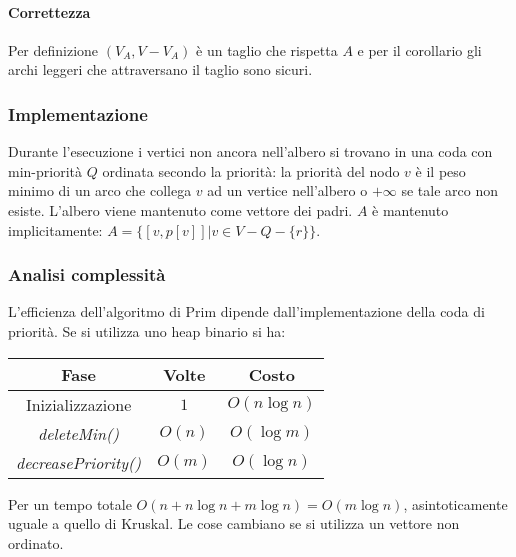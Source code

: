 	\paragraph{Correttezza} Per definizione $(V_A, V - V_A)$ \`e un taglio che rispetta $A$ e per il corollario gli archi leggeri che attraversano il taglio sono sicuri. 
	\subsubsection{Implementazione}
	Durante l'esecuzione i vertici non ancora nell'albero si trovano in una coda con min-priorit\`a $Q$ ordinata secondo la priorit\`a: la priorit\`a del nodo $v$ \`e il peso minimo di un
	arco che collega $v$ ad un vertice nell'albero o $+\infty$ se tale arco non esiste. L'albero viene mantenuto come vettore dei padri. $A$ \`e mantenuto implicitamente: $A=\{[v, p[v]]|v\in
	V-Q-\{r\}\}$. \\
	
	\subsubsection{Analisi complessit\`a}
	L'efficienza dell'algoritmo di Prim dipende dall'implementazione della coda di priorit\`a. Se si utilizza uno heap binario si ha:
	\begin{center}
	\begin{tabular}{|c|c|c|}
		\hline
		\textbf{Fase} & \textbf{Volte} & \textbf{Costo} \\
		\hline
		Inizializzazione & $1$ & $O(n\log n)$ \\
		\hline
		\emph{deleteMin()} & $O(n)$ & $O(\log m)$ \\
		\hline
		\emph{decreasePriority()} & $O(m)$ & $O(\log n)$\\
		\hline
	\end{tabular}
	\end{center}
	Per un tempo totale $O(n+n\log n+m\log n) = O(m\log n)$, asintoticamente uguale a quello di Kruskal. Le cose cambiano se si utilizza un vettore non ordinato.
